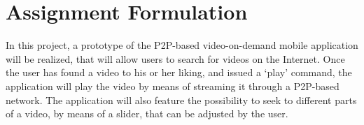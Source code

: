 \section{Assignment Formulation}
In this project, a prototype of the P2P-based video-on-demand mobile application will be realized, that will allow users to search for videos on the Internet. Once the user has found a video to his or her liking, and issued a ‘play’ command, the application will play the video by means of streaming it through a P2P-based network. The application will also feature the possibility to seek to different parts of a video, by means of a slider, that can be adjusted by the user.
